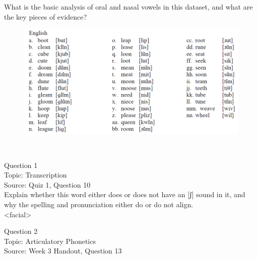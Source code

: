 \documentclass[12pt]{article}
\begin{document}
What is the basic analysis of oral and nasal vowels in this dataset, and what are the key pieces of evidence?\\

\begin{figure}[H]
\includegraphics{../images/english12.png}
\end{figure}

\newpage

\begin{center}
\textbf{{\color{red}{\HUGE END OF EXAM}}}\\

\end{center}
\newpage

\begin{center}
\textbf{{\color{blue}{\HUGE START OF EXAM\\}}}

\textbf{{\color{blue}{\HUGE Student ID: 52900\\}}}

\textbf{{\color{blue}{\HUGE \\}}}

\end{center}
\newpage

{\large Question 1}\\

Topic: Transcription\\
Source: Quiz 1, Question 10\\

Explain whether this word either does or does not have an [ʃ] sound in it, and why the spelling and pronunciation either do or do not align.\\

<facial>


\newpage

{\large Question 2}\\

Topic: Articulatory Phonetics\\
Source: Week 3 Handout, Question 13\\
\end{document}
